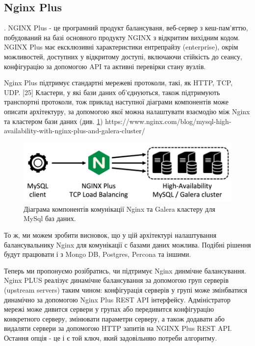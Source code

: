 \documentclass[14pt]{vakthesis}
\begin{document}
\subsection{Nginx Plus}. NGINX Plus - це програмний продукт балансуваня, веб-сервер з кеш-пам'яттю, побудований на базі основного продукту NGINX з відкритим вихідним кодом. NGINX Plus має ексклюзивні характеристики ентрепрайзу (enterprise), окрім можливостей, доступних у відкритому доступі, включаючи стійкість до сеансу, конфігурацію за допомогою API та активні перевірки стану вузлів. 


Nginx Plus підтримує стандартні мережеві протоколи, такі, як HTTP, TCP, UDP. [25] %
Кластери, у які  бази даних об'єднуються, також підтримують транспортні протоколи, тож приклад наступної діаграми компонентів може описати архітектуру, за допомогою якої можна налаштувати взаємодію між Nginx та кластером бази даних (див. \ref{fig:nginx_mysql})
https://www.nginx.com/blog/mysql-high-availability-with-nginx-plus-and-galera-cluster/

\begin{figure}
\centering
\includegraphics[width=\linewidth]{images/nginx-plus-load-balancing.png}
     \caption{Діаграма компонентів комунікації Nginx та Galera кластеру для MySql баз даних.}
     \label{fig:nginx_mysql}
\end{figure}

То ж, ми можем зробити висновок, що у цій архітектурі налаштування балансувальнику Nginx для комунікації с базами даних можлива. Подібні рішення будут працювати і з Mongo DB, Postgres, Percona та іншими. 

Теперь ми пропонуємо розібратись, чи підтримує Nginx динмічне балансування. 
Nginx PLUS реалізує динамічне балансування за допомогою груп серверів (upstream servers) таким чином: конфігурація серверів у групі може змінбватися динамічно за допомогою Nginx Plus REST API інтерфейсу. Адміністратор мережі може дивится сервери у групах або передивится конфігурацію конкретного серверу, змінювати параметри серверу, а також додавати або видаляти сервери за допомогою HTTP запитів на NGINX Plus REST API.
Остання опція - це і є той ключ, який задовільняю потреби алгоритму. 
\end{document}
